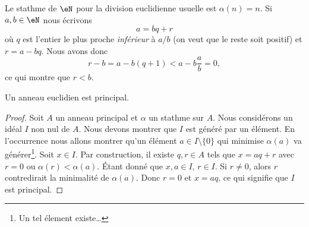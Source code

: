 \begin{example} \label{ExwqlCwvV}
    Le stathme de \( \eN\) pour la division euclidienne usuelle est \( \alpha(n)=n\). Si \( a,b\in \eN\) nous écrivons
    \begin{equation}
        a=bq+r
    \end{equation}
    où \( q\) est l'entier le plus proche \emph{inférieur} à \( a/b\) (on veut que le reste soit positif) et \( r=a-bq\). Nous avons donc
    \begin{equation}
        r-b=a-b(q+1)<a-b\frac{ a }{ b }=0,
    \end{equation}
    ce qui montre que \( r<b\).
\end{example}

\begin{proposition}\label{Propkllxnv}
    Un anneau euclidien est principal.
\end{proposition}

\begin{proof}
    Soit \( A\) un anneau principal et \( \alpha\) un stathme sur \( A\). Nous considérons un idéal \( I\) non nul de \( A\). Nous devons montrer que \( I\) est généré par un élément. En l'occurrence nous allons montrer qu'un élément \( a\in I\setminus\{ 0 \}\) qui minimise \( \alpha(a)\) va générer\footnote{Un tel élement existe\dots}. Soit \( x\in I\). Par construction, il existe \( q,r\in A\) tels que \( x=aq+r\) avec \( r=0\) ou \( \alpha(r)<\alpha(a)\). Étant donné que \( x,a\in I\), \( r\in I\). Si \( r\neq 0\), alors \( r\) contredirait la minimalité de \( \alpha(a)\). Donc \( r=0\) et \( x=aq\), ce qui signifie que \( I\) est principal.
\end{proof}


